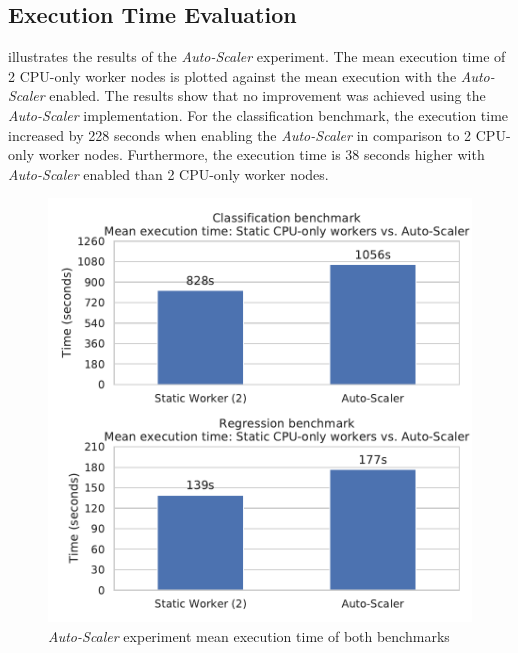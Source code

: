 \subsection{Execution Time Evaluation}
 illustrates the results of the \textit{Auto-Scaler} experiment. The mean execution time of 2 CPU-only worker nodes is plotted against the mean execution with the \textit{Auto-Scaler} enabled.
The results show that no improvement was achieved using the \textit{Auto-Scaler} implementation.
For the classification benchmark, the execution time increased by 228 seconds when enabling the \textit{Auto-Scaler} in comparison to 2 CPU-only worker nodes. Furthermore, the execution time is 38 seconds higher with \textit{Auto-Scaler} enabled than 2 CPU-only worker nodes.
\begin{figure}[h]
\centering
\includegraphics[scale=0.9]{images/07_evaluation/overall_auto-scaler}
\caption{\textit{Auto-Scaler} experiment mean execution time of both benchmarks}
\label{fig:07_auto-scaler_results}
\end{figure}

\newpage
